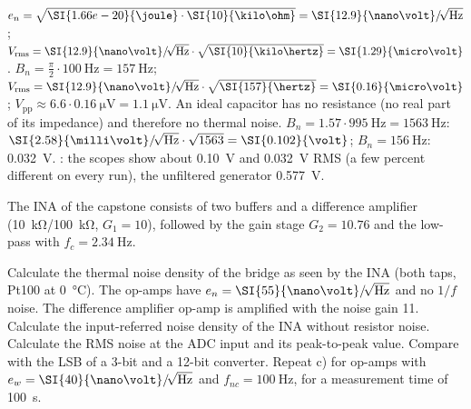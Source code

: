 \begin{solution}
\begin{talist}
\ta $e_n = \sqrt{\SI{1.66e-20}{\joule}\cdot\SI{10}{\kilo\ohm}} = \SI{12.9}{\nano\volt}\rtHz$;
	$V_\mathrm{rms} = \SI{12.9}{\nano\volt}\rtHz\cdot\sqrt{\SI{10}{\kilo\hertz}} = \SI{1.29}{\micro\volt}$.
\ta $B_n = \frac{\pi}{2}\cdot\SI{100}{\hertz} = \SI{157}{\hertz}$;
	$V_\mathrm{rms} = \SI{12.9}{\nano\volt}\rtHz\cdot\sqrt{\SI{157}{\hertz}} = \SI{0.16}{\micro\volt}$;
	$V_\mathrm{pp} \approx 6.6\cdot\SI{0.16}{\micro\volt} = \SI{1.1}{\micro\volt}$.
\ta An ideal capacitor has no resistance (no real part of its impedance) and therefore no thermal noise.
\ta $B_n = 1.57\cdot\SI{995}{\hertz} = \SI{1563}{\hertz}$: $\SI{2.58}{\milli\volt}\rtHz\cdot\sqrt{1563} = \SI{0.102}{\volt}$;
	$B_n = \SI{156}{\hertz}$: \SI{0.032}{\volt}.
	: the scopes show about \SI{0.10}{\volt} and \SI{0.032}{\volt} RMS
	(a few percent different on every run), the unfiltered generator \SI{0.577}{\volt}.
\end{talist}
\end{solution}

\label{ex:noise-ina}
The INA of the capstone consists of two buffers and a difference amplifier
(\SI{10}{\kilo\ohm}/\SI{100}{\kilo\ohm}, $G_1 = 10$), followed by the gain stage
$G_2 = 10.76$ and the low-pass with $f_c = \SI{2.34}{\hertz}$.
\begin{talist}
\ta Calculate the thermal noise density of the bridge as seen by the INA (both taps, Pt100 at \SI{0}{\celsius}).
\ta The op-amps have $e_n = \SI{55}{\nano\volt}\rtHz$ and no $1/f$ noise. The difference amplifier op-amp is amplified with the noise gain 11. Calculate the input-referred noise density of the INA without resistor noise.
\ta Calculate the RMS noise at the ADC input and its peak-to-peak value. Compare with the LSB of a 3-bit and a 12-bit converter.
\ta Repeat c) for op-amps with $e_w = \SI{40}{\nano\volt}\rtHz$ and $f_{nc} = \SI{100}{\hertz}$, for a measurement time of \SI{100}{\second}.
\end{talist}

